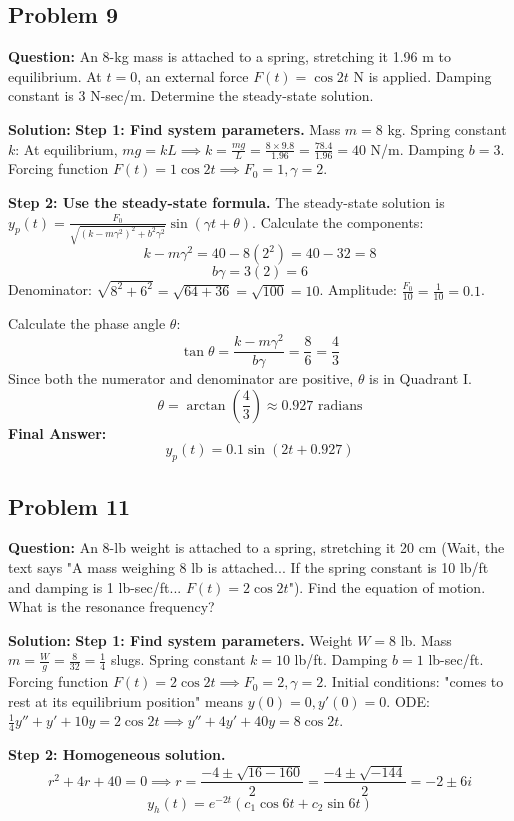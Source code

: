 \documentclass[11pt]{article}
\begin{document}
\subsection{Problem 9}
\textbf{Question:} An 8-kg mass is attached to a spring, stretching it 1.96 m to equilibrium. At $t=0$, an external force $F(t) = \cos 2t$ N is applied. Damping constant is 3 N-sec/m. Determine the steady-state solution.

\textbf{Solution:}
\textbf{Step 1: Find system parameters.}
Mass $m = 8$ kg.
Spring constant $k$: At equilibrium, $mg = kL \implies k = \frac{mg}{L} = \frac{8 \times 9.8}{1.96} = \frac{78.4}{1.96} = 40$ N/m.
Damping $b = 3$.
Forcing function $F(t) = 1 \cos 2t \implies F_0 = 1, \gamma = 2$.

\textbf{Step 2: Use the steady-state formula.}
The steady-state solution is $y_p(t) = \frac{F_0}{\sqrt{(k-m\gamma^2)^2 + b^2\gamma^2}} \sin(\gamma t + \theta)$.
Calculate the components:
\[ k - m\gamma^2 = 40 - 8(2^2) = 40 - 32 = 8 \]
\[ b\gamma = 3(2) = 6 \]
Denominator: $\sqrt{8^2 + 6^2} = \sqrt{64 + 36} = \sqrt{100} = 10$.
Amplitude: $\frac{F_0}{10} = \frac{1}{10} = 0.1$.

Calculate the phase angle $\theta$:
\[ \tan \theta = \frac{k-m\gamma^2}{b\gamma} = \frac{8}{6} = \frac{4}{3} \]
Since both the numerator and denominator are positive, $\theta$ is in Quadrant I.
\[ \theta = \arctan\left(\frac{4}{3}\right) \approx 0.927 \text{ radians} \]
\textbf{Final Answer:}
\[ y_p(t) = 0.1 \sin(2t + 0.927) \]

\subsection{Problem 11}
\textbf{Question:} An 8-lb weight is attached to a spring, stretching it 20 cm (Wait, the text says "A mass weighing 8 lb is attached... If the spring constant is 10 lb/ft and damping is 1 lb-sec/ft... $F(t) = 2\cos 2t$"). Find the equation of motion. What is the resonance frequency?

\textbf{Solution:}
\textbf{Step 1: Find system parameters.}
Weight $W = 8$ lb. Mass $m = \frac{W}{g} = \frac{8}{32} = \frac{1}{4}$ slugs.
Spring constant $k = 10$ lb/ft.
Damping $b = 1$ lb-sec/ft.
Forcing function $F(t) = 2 \cos 2t \implies F_0 = 2, \gamma = 2$.
Initial conditions: "comes to rest at its equilibrium position" means $y(0) = 0, y'(0) = 0$.
ODE: $\frac{1}{4}y'' + y' + 10y = 2 \cos 2t \implies y'' + 4y' + 40y = 8 \cos 2t$.

\textbf{Step 2: Homogeneous solution.}
\[ r^2 + 4r + 40 = 0 \implies r = \frac{-4 \pm \sqrt{16 - 160}}{2} = \frac{-4 \pm \sqrt{-144}}{2} = -2 \pm 6i \]
\[ y_h(t) = e^{-2t}(c_1 \cos 6t + c_2 \sin 6t) \]
\end{document}
